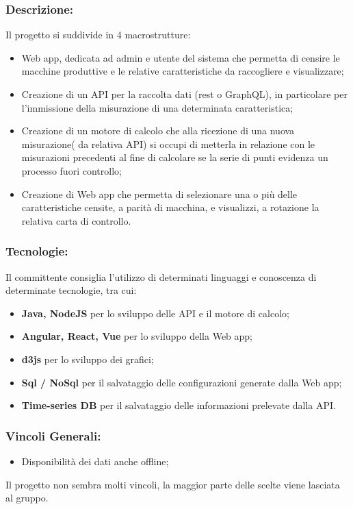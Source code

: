 \subsubsection{Descrizione:}
Il progetto si suddivide in 4 macrostrutture:
\begin{itemize}
	\item Web app, dedicata ad admin e utente del sistema che permetta di censire le macchine produttive e le relative caratteristiche da raccogliere e visualizzare;
	\item Creazione di un API per la raccolta dati (rest o GraphQL), in particolare per l’immissione della misurazione di una determinata caratteristica;
	\item Creazione di un motore di calcolo che alla ricezione di una nuova misurazione( da relativa API) si occupi di metterla in relazione con le misurazioni precedenti al fine di calcolare se la serie di punti evidenza un processo fuori controllo; 
	\item Creazione di Web app che permetta di selezionare una o più delle caratteristiche censite, a parità di macchina, e visualizzi, a rotazione la relativa carta di controllo.
\end{itemize}

\subsubsection{Tecnologie:}
Il committente consiglia l’utilizzo di determinati linguaggi e conoscenza di determinate tecnologie, tra cui:
\begin{itemize}
	\item \textbf{Java, NodeJS} per lo sviluppo delle API e il motore di calcolo;
	\item \textbf{Angular, React, Vue} per lo sviluppo della Web app;
	\item \textbf{d3js} per lo sviluppo dei grafici;
	\item \textbf{Sql / NoSql} per il salvataggio delle configurazioni generate dalla Web app;
	\item \textbf{Time-series DB} per il salvataggio delle informazioni prelevate dalla API.
\end{itemize}

\subsubsection{Vincoli Generali:}
\begin{itemize}
	\item Disponibilità dei dati anche offline;
\end{itemize}
Il progetto non sembra molti vincoli, la maggior parte delle scelte viene lasciata al gruppo.

